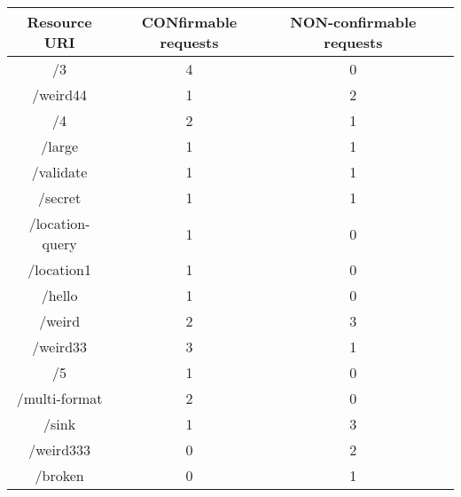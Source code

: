 \documentclass[a4paper,11pt]{article} %
\begin{document}
\begin{itemize}
        \begin{center}
            \begin{tabular}{|c|c|c|c|}
                \hline
                Resource URI    & CONfirmable requests & NON-confirmable requests \\
                \hline
                /3              & 4                    & 0                        \\
                \hline
                /weird44        & 1                    & 2                        \\
                \hline
                /4              & 2                    & 1                        \\
                \hline
                /large          & 1                    & 1                        \\
                \hline
                /validate       & 1                    & 1                        \\
                \hline
                /secret         & 1                    & 1                        \\
                \hline
                /location-query & 1                    & 0                        \\
                \hline
                /location1      & 1                    & 0                        \\
                \hline
                /hello          & 1                    & 0                        \\
                \hline
                /weird          & 2                    & 3                        \\
                \hline
                /weird33        & 3                    & 1                        \\
                \hline
                /5              & 1                    & 0                        \\
                \hline
                /multi-format   & 2                    & 0                        \\
                \hline
                /sink           & 1                    & 3                        \\
                \hline
                /weird333       & 0                    & 2                        \\
                \hline
                /broken         & 0                    & 1                        \\

\end{tabular}
\end{center}
\end{itemize}
\end{document}
